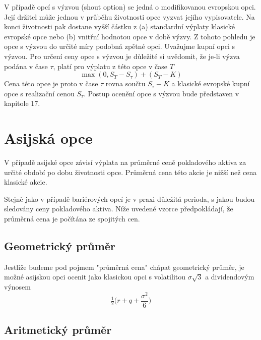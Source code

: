 \documentclass[a4paper]{book}
\begin{document}
V případě opcí s výzvou (shout option) se jedná o modifikovanou evropskou opci. Její držitel může jednou v průběhu životnosti opce vyzvat jejího vypisovatele. Na konci životnosti pak dostane vyšší částku z (a) standardní výplaty klasické evropské opce nebo (b) vnitřní hodnotou opce v době výzvy. Z tohoto pohledu je opce s výzvou do určité míry podobná zpětné opci. Uvažujme kupní opci s výzvou. Pro určení ceny opce s výzvou je důležité si uvědomit, že je-li výzva podána v čase $\tau$, platí pro výplatu z této opce v čase $T$
\begin{equation*}
\max(0,S_T - S_{\tau})+(S_T - K)
\end{equation*}
Cena této opce je proto v čase $\tau$ rovna součtu $S_{\tau}-K$ a klasické evropské kupní opce s realizační cenou $S_{\tau}$. Postup ocenění opce s výzvou bude představen v  kapitole 17.

\section {Asijská opce}

V případě asijské opce závisí výplata na průměrné ceně pokladového aktiva za určité období po dobu životnosti opce. Průměrná cena této akcie je nižší než cena klasické akcie.

Stejně jako v případě bariérových opcí je v praxi důležitá perioda, s jakou budou sledovány ceny pokladového aktiva. Níže uvedené vzorce předpokládají, že průměrná cena je počítána ze spojitých cen.

\subsection{Geometrický průměr}

Jestliže budeme pod pojmem "průměrná cena" chápat geometrický průměr, je možné asijskou opci ocenit jako klasickou opci s volatilitou $\sigma \sqrt{3}$ a dividendovým výnosem
\begin{equation*}
\tfrac{1}{2} \Bigg( r + q + \frac{\sigma^2}{6} \Bigg)
\end{equation*}

\subsection{Aritmetický průměr}
\end{document}
